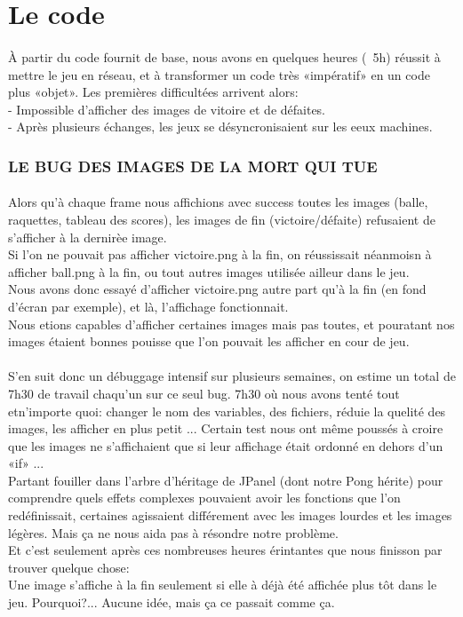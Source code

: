 \documentclass[a4paper, 12pt]{scrreprt}
\begin{document}
\section*{Le code}
\paragraph{}
À partir du code fournit de base, nous avons en quelques heures (~5h) réussit à mettre le jeu en réseau, et à transformer un code très «impératif» en un code plus «objet».
Les premières difficultées arrivent alors:
\\- Impossible d'afficher des images de vitoire et de défaites.
\\- Après plusieurs échanges, les jeux se désyncronisaient sur les eeux machines.
\subsubsection*{LE BUG DES IMAGES DE LA MORT QUI TUE}
\paragraph{}
Alors qu'à chaque frame nous affichions avec success toutes les images (balle, raquettes, tableau des scores), les images de fin (victoire/défaite) refusaient de s'afficher à la dernirèe image.
\\Si l'on ne pouvait pas afficher victoire.png à la fin, on réussissait néanmoisn à afficher ball.png à la fin, ou tout autres images utilisée ailleur dans le jeu.
\\Nous avons donc essayé d'afficher victoire.png autre part qu'à la fin (en fond d'écran par exemple), et là, l'affichage fonctionnait.
\\Nous etions capables d'afficher certaines images mais pas toutes, et pouratant nos images étaient bonnes pouisse que l'on pouvait les afficher en cour de jeu.
\paragraph{}
S'en suit donc un débuggage intensif sur plusieurs semaines, on estime un total de 7h30 de travail chaqu'un sur ce seul bug. 7h30 où nous avons tenté tout etn'importe quoi: changer le nom des variables, des fichiers, réduie la quelité des images, les afficher en plus petit ... Certain test nous ont même poussés à croire que les images ne s'affichaient que si leur affichage était ordonné en dehors d'un «if» ...
\\Partant fouiller dans l'arbre d'héritage de JPanel (dont notre Pong hérite) pour comprendre quels effets complexes pouvaient avoir les fonctions que l'on redéfinissait, certaines agissaient différement avec les images lourdes et les images légères. Mais ça ne nous aida pas à résondre notre problème.
\\Et c'est seulement après ces nombreuses heures érintantes que nous finisson par trouver quelque chose:
\\Une image s'affiche à la fin seulement si elle à déjà été affichée plus tôt dans le jeu. Pourquoi?... Aucune idée, mais ça ce passait comme ça.
\end{document}

